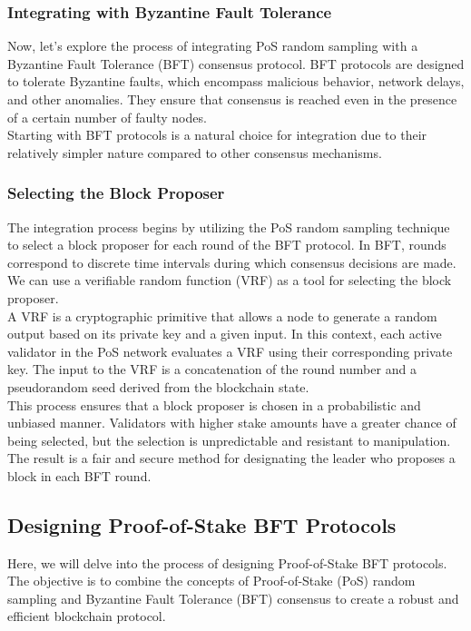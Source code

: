\subsubsection{Integrating with Byzantine Fault Tolerance}
Now, let's explore the process of integrating PoS random sampling with a Byzantine Fault Tolerance (BFT) consensus protocol. BFT protocols are designed to tolerate Byzantine faults, which encompass malicious behavior, network delays, and other anomalies. They ensure that consensus is reached even in the presence of a certain number of faulty nodes.\\
Starting with BFT protocols is a natural choice for integration due to their relatively simpler nature compared to other consensus mechanisms. 
\subsubsection{Selecting the Block Proposer}
The integration process begins by utilizing the PoS random sampling technique to select a block proposer for each round of the BFT protocol. In BFT, rounds correspond to discrete time intervals during which consensus decisions are made. We can use a verifiable random function (VRF) as a tool for selecting the block proposer.\\
A VRF is a cryptographic primitive that allows a node to generate a random output based on its private key and a given input. In this context, each active validator in the PoS network evaluates a VRF using their corresponding private key. The input to the VRF is a concatenation of the round number and a pseudorandom seed derived from the blockchain state.\\
This process ensures that a block proposer is chosen in a probabilistic and unbiased manner. Validators with higher stake amounts have a greater chance of being selected, but the selection is unpredictable and resistant to manipulation. The result is a fair and secure method for designating the leader who proposes a block in each BFT round.

\subsection{Designing Proof-of-Stake BFT Protocols}
Here, we will delve into the process of designing Proof-of-Stake BFT protocols. The objective is to combine the concepts of Proof-of-Stake (PoS) random sampling and Byzantine Fault Tolerance (BFT) consensus to create a robust and efficient blockchain protocol.

